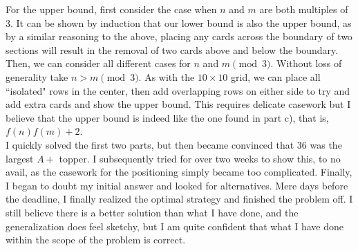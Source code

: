 \documentclass{article}
\begin{document}
    For the upper bound, first consider the case when $n$ and $m$ are both multiples of $3$. It can be shown by induction that our lower bound is also the upper bound, as by a similar reasoning to the above, placing any cards across the boundary of two sections will result in the removal of two cards above and below the boundary. Then, we can consider all different cases for $n$ and $m \pmod 3$. Without loss of generality take $n > m \pmod 3$. As with the $10\times 10$ grid, we can place all ``isolated" rows in the center, then add overlapping rows on either side to try and add extra cards and show the upper bound. This requires delicate casework but I believe that the upper bound is indeed like the one found in part c), that is, $f(n)f(m) + 2$. \\

    I quickly solved the first two parts, but then became convinced that $36$ was the largest $A+$ topper. I subsequently tried for over two weeks to show this, to no avail, as the casework for the positioning simply became too complicated. Finally, I began to doubt my initial answer and looked for alternatives. Mere days before the deadline, I finally realized the optimal strategy and finished the problem off. I still believe there is a better solution than what I have done, and the generalization does feel sketchy, but I am quite confident that what I have done within the scope of the problem is correct.
    
\end{document}
